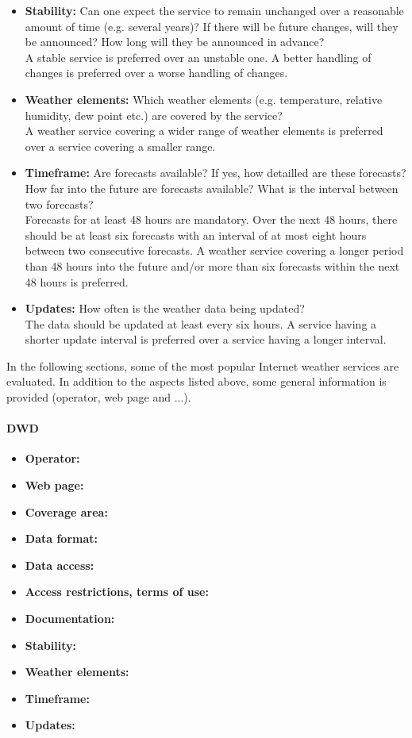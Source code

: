 \begin{itemize}
  \item \textbf{Stability:} Can one expect the service to remain unchanged over a reasonable amount of time (e.g. several years)? If there will be future changes, will they be announced? How long will they be announced in advance?\\
  A stable service is preferred over an unstable one. A better handling of changes is preferred over a worse handling of changes.
  \item \textbf{Weather elements:} Which weather elements (e.g. temperature, relative humidity, dew point etc.) are covered by the service?\\
  A weather service covering a wider range of weather elements is preferred over a service covering a smaller range.
  \item \textbf{Timeframe:} Are forecasts available? If yes, how detailled are these forecasts? How far into the future are forecasts available? What is the interval between two forecasts?\\
  Forecasts for at least 48 hours are mandatory. Over the next 48 hours, there should be at least six forecasts with an interval of at most eight hours between two consecutive forecasts. A weather service covering a longer period than 48 hours into the future and/or more than six forecasts within the next 48 hours is preferred.
  \item \textbf{Updates:} How often is the weather data being updated?\\
  The data should be updated at least every six hours. A service having a shorter update interval is preferred over a service having a longer interval.
\end{itemize}

In the following sections, some of the most popular Internet weather services are evaluated. In addition to the aspects listed above, some general information is provided (operator, web page and ...). %

\paragraph{DWD}

\begin{itemize}
  \item \textbf{Operator:}
  \item \textbf{Web page:}
  \item \textbf{Coverage area:}
  \item \textbf{Data format:}
  \item \textbf{Data access:}
  \item \textbf{Access restrictions, terms of use:}
  \item \textbf{Documentation:}
  \item \textbf{Stability:}
  \item \textbf{Weather elements:}
  \item \textbf{Timeframe:}
  \item \textbf{Updates:}
\end{itemize}

